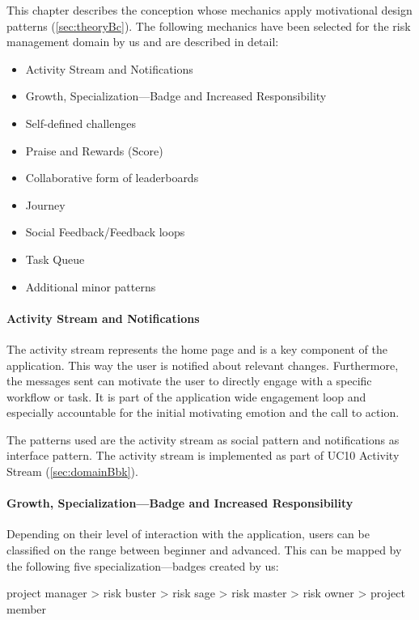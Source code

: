 This chapter describes the conception whose mechanics apply motivational design patterns (\ref{sec:theoryBc}).
The following mechanics have been selected for the risk management domain by us and are described in detail:
\begin{itemize}
	\item Activity Stream and Notifications
	\item Growth, Specialization—Badge and Increased Responsibility
	\item Self-defined challenges
	\item Praise and Rewards (Score)
	\item Collaborative form of leaderboards
	\item Journey
	\item Social Feedback/Feedback loops
	\item Task Queue
	\item Additional minor patterns
\end{itemize}

\paragraph*{Activity Stream and Notifications}
The activity stream represents the home page and is a key component of the application. This way the user is notified about relevant changes. Furthermore, the messages sent can motivate the user to directly engage with a specific workflow or task. 
It is part of the application wide engagement loop and especially accountable for the initial motivating emotion and the call to action.

The patterns used are the activity stream as social pattern and notifications as interface pattern.
The activity stream is implemented as part of \ac{UC}10 Activity Stream (\ref{sec:domainBbk}).

\paragraph*{Growth, Specialization—Badge and Increased Responsibility}

Depending on their level of interaction with the application, users can be classified on the range between beginner and advanced. This can be mapped by the following five specialization—badges created by us:

project manager > risk buster > risk sage > risk master > risk owner > project member

